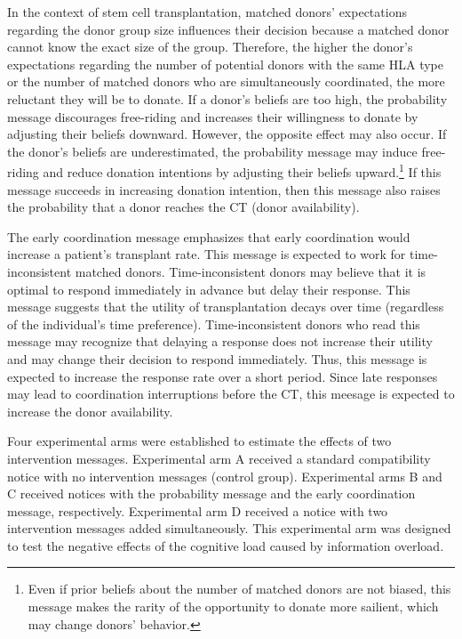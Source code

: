 \documentclass[12pt, a4paper]{article}
\begin{document}
In the context of stem cell transplantation, matched donors' expectations regarding the donor group size influences their decision because a matched donor cannot know the exact size of the group. Therefore, the higher the donor's expectations regarding the number of potential donors with the same HLA type or the number of matched donors who are simultaneously coordinated, the more reluctant they will be to donate. If a donor's beliefs are too high, the probability message discourages free-riding and increases their willingness to donate by adjusting their beliefs downward. However, the opposite effect may also occur. If the donor's beliefs are underestimated, the probability message may induce free-riding and reduce donation intentions by adjusting their beliefs upward.\footnote{Even if prior beliefs about the number of matched donors are not biased, this message makes the rarity of the opportunity to donate more sailient, which may change donors' behavior.} If this message succeeds in increasing donation intention, then this message also raises the probability that a donor reaches the CT (donor availability).

The early coordination message emphasizes that early coordination would increase a patient's transplant rate. This message is expected to work for time-inconsistent matched donors. Time-inconsistent donors may believe that it is optimal to respond immediately in advance but delay their response. This message suggests that the utility of transplantation decays over time (regardless of the individual's time preference). Time-inconsistent donors who read this message may recognize that delaying a response does not increase their utility and may change their decision to respond immediately. Thus, this message is expected to increase the response rate over a short period. Since late responses may lead to coordination interruptions before the CT, this meesage is expected to increase the donor availability.

Four experimental arms were established to estimate the effects of two intervention messages. Experimental arm A received a standard compatibility notice with no intervention messages (control group). Experimental arms B and C received notices with the probability message and the early coordination message, respectively. Experimental arm D received a notice with two intervention messages added simultaneously. This experimental arm was designed to test the negative effects of the cognitive load caused by information overload.
\end{document}
